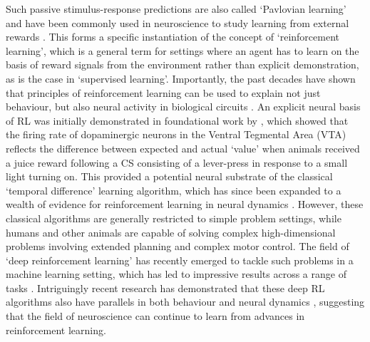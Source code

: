 Such passive stimulus-response predictions are also called `Pavlovian learning' and have been commonly used in neuroscience to study learning from external rewards \citep{niv2009reinforcement}.
This forms a specific instantiation of the concept of `reinforcement learning', which is a general term for settings where an agent has to learn on the basis of reward signals from the environment rather than explicit demonstration, as is the case in `supervised learning'.
Importantly, the past decades have shown that principles of reinforcement learning can be used to explain not just behaviour, but also neural activity in biological circuits \citep{niv2009reinforcement}.
An explicit neural basis of RL was initially demonstrated in foundational work by \citet{schultz1997neural}, which showed that the firing rate of dopaminergic neurons in the Ventral Tegmental Area (VTA) reflects the difference between expected and actual `value' when animals received a juice reward following a CS consisting of a lever-press in response to a small light turning on.
This provided a potential neural substrate of the classical `temporal difference' learning algorithm, which has since been expanded to a wealth of evidence for reinforcement learning in neural dynamics \citep{niv2009reinforcement, dabney2020distributional}.
However, these classical algorithms are generally restricted to simple problem settings, while humans and other animals are capable of solving complex high-dimensional problems involving extended planning and complex motor control.
The field of `deep reinforcement learning' has recently emerged to tackle such problems in a machine learning setting, which has led to impressive results across a range of tasks \citep{mnih2013playing, schrittwieser2020mastering, wurman2022outracing, vinyals2019grandmaster}.
Intriguingly recent research has demonstrated that these deep RL algorithms also have parallels in both behaviour and neural dynamics \citep{botvinick2020deep, wang2018prefrontal, dabney2020distributional, jensen2023recurrent}, suggesting that the field of neuroscience can continue to learn from advances in reinforcement learning.

